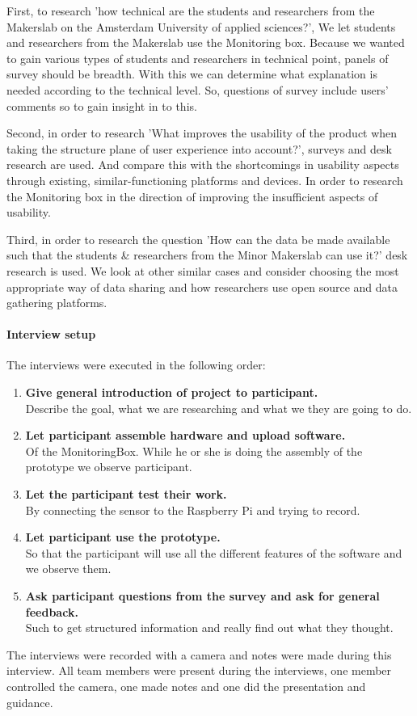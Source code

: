 \documentclass[conference]{IEEEtran}
\begin{document}
			First, to research 'how technical are the students and researchers from the Makerslab on the Amsterdam University of applied sciences?', We let students and researchers from the Makerslab use the Monitoring box. Because we wanted to gain various types of students and researchers in technical point, panels of survey should be breadth. With this we can determine what explanation is needed according to the technical level. So, questions of survey include users' comments so to gain insight in to this. 

			Second, in order to research 'What improves the usability of the product when taking the structure plane of user experience into account?', surveys and desk research are used. And compare this with the shortcomings in usability aspects through existing, similar-functioning platforms and devices. In order to research the Monitoring box in the direction of improving the insufficient aspects of usability.

			Third, in order to research the question 'How can the data be made available such that the students \& researchers from the Minor Makerslab can use it?' desk research is used. We look at other similar cases and consider choosing the most appropriate way of data sharing and how researchers use open source and data gathering platforms.
		\paragraph{Interview setup} The interviews were executed in the following order:
			\begin{enumerate}
				\item \textbf{Give general introduction of project to participant.} \\
				Describe the goal, what we are researching and what we they are going to do.
				\item \textbf{Let participant assemble hardware and upload software.}\\
				Of the MonitoringBox. While he or she is doing the assembly of the prototype we observe participant.
				\item \textbf{Let the participant test their work.}\\
				By connecting the sensor to the Raspberry Pi and trying to record.
				\item \textbf{Let participant use the prototype.}\\
				So that the participant will use all the different features of the software and we observe them.
				\item \textbf{Ask participant questions from the survey and ask for general feedback.}\\
				Such to get structured information and really find out what they thought.
			\end{enumerate}
			The interviews were recorded with a camera and notes were made during this interview. All team members were present during the interviews, one member controlled the camera, one made notes and one did the presentation and guidance.
\end{document}
